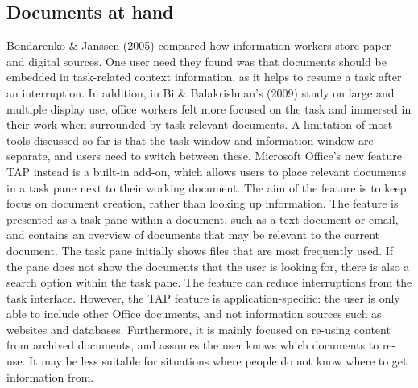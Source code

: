 \subsection{Documents at hand}
Bondarenko \& Janssen (2005) compared how information workers store paper and digital sources. One user need they found was that documents should be embedded in task-related context information, as it helps to resume a task after an interruption. In addition, in Bi \& Balakrishnan's (2009) study on large and multiple display use, office workers felt more focused on the task and immersed in their work when surrounded by task-relevant documents. A limitation of most tools discussed so far is that the task window and information window are separate, and users need to switch between these. Microsoft Office's new feature TAP instead is a built-in add-on, which allows users to place relevant documents in a task pane next to their working document. The aim of the feature is to keep focus on document creation, rather than looking up information. The feature is presented as a task pane within a document, such as a text document or email, and contains an overview of documents that may be relevant to the current document. The task pane initially shows files that are most frequently used. If the pane does not show the documents that the user is looking for, there is also a search option within the task pane. 
The feature can reduce interruptions from the task interface. However, the TAP feature is application-specific: the user is only able to include other Office documents, and not information sources such as websites and databases. Furthermore, it is mainly focused on re-using content from archived documents, and assumes the user knows which documents to re-use. It may be less suitable for situations where people do not know where to get information from.  
 
